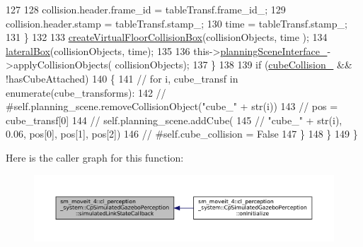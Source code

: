 \begin{DoxyCode}
127 
128                             collision.header.frame\_id = tableTransf.frame\_id\_;
129                             collision.header.stamp = tableTransf.stamp\_;
130                             time = tableTransf.stamp\_;
131                         \}
132 
133                         \hyperlink{classsm__moveit__4_1_1cl__perception__system_1_1CpSimulatedGazeboPerception_a668b93281f2ab325c790e20f452f3f8f}{createVirtualFloorCollisionBox}(collisionObjects, time
      );
134                         \hyperlink{classsm__moveit__4_1_1cl__perception__system_1_1CpSimulatedGazeboPerception_adf4810736ecdd01ba42fc86ea337e5e1}{lateralBox}(collisionObjects, time);
135 
136                         this->\hyperlink{classsm__moveit__4_1_1cl__perception__system_1_1CpSimulatedGazeboPerception_a34bbc7a8b23a1b1c2d3d4d30bd2fe767}{planningSceneInterface\_}->applyCollisionObjects(
      collisionObjects);
137                     \}
138 
139                     \textcolor{keywordflow}{if} (\hyperlink{classsm__moveit__4_1_1cl__perception__system_1_1CpSimulatedGazeboPerception_a5f043c05aa335a438459a55b51e6ace6}{cubeCollision\_} && !hasCubeAttached)
140                     \{
141                         \textcolor{comment}{//         for i, cube\_transf in enumerate(cube\_transforms):}
142                         \textcolor{comment}{//             #self.planning\_scene.removeCollisionObject("cube\_" + str(i))}
143                         \textcolor{comment}{//             pos = cube\_transf[0]}
144                         \textcolor{comment}{//             self.planning\_scene.addCube(}
145                         \textcolor{comment}{//                 "cube\_" + str(i), 0.06, pos[0],  pos[1],  pos[2])}
146                         \textcolor{comment}{//             #self.cube\_collision = False}
147                     \}
148                 \}
149             \}
\end{DoxyCode}
Here is the caller graph for this function\+:
\nopagebreak
\begin{figure}[H]
\begin{center}
\leavevmode
\includegraphics[width=350pt]{classsm__moveit__4_1_1cl__perception__system_1_1CpSimulatedGazeboPerception_a7914ffd20518c866a8a1e11254589d12_icgraph}
\end{center}
\end{figure}
